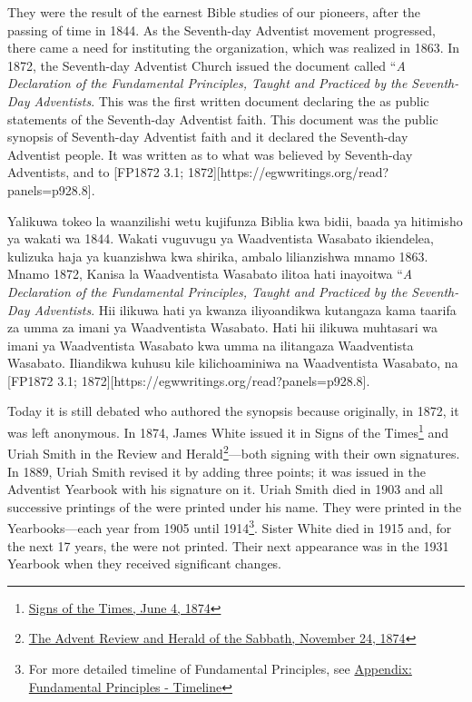They were the result of the earnest Bible studies of our pioneers, after the passing of time in 1844. As the Seventh-day Adventist movement progressed, there came a need for instituting the organization, which was realized in 1863. In 1872, the Seventh-day Adventist Church issued the document called “\textit{A Declaration of the Fundamental Principles, Taught and Practiced by the Seventh-Day Adventists}. This was the first written document declaring the  as public statements of the Seventh-day Adventist faith. This document was the public synopsis of Seventh-day Adventist faith and it declared  the Seventh-day Adventist people. It was written  as to what was believed by Seventh-day Adventists,  and to [FP1872 3.1; 1872][https://egwwritings.org/read?panels=p928.8].


Yalikuwa tokeo la waanzilishi wetu kujifunza Biblia kwa bidii, baada ya hitimisho ya wakati wa 1844. Wakati vuguvugu ya Waadventista Wasabato ikiendelea, kulizuka haja ya kuanzishwa kwa shirika, ambalo lilianzishwa mnamo 1863. Mnamo 1872, Kanisa la Waadventista Wasabato ilitoa hati inayoitwa “\textit{A Declaration of the Fundamental Principles, Taught and Practiced by the Seventh-Day Adventists}. Hii ilikuwa hati ya kwanza iliyoandikwa kutangaza  kama taarifa za umma za imani ya Waadventista Wasabato. Hati hii ilikuwa muhtasari wa imani ya Waadventista Wasabato kwa umma na ilitangaza  Waadventista Wasabato. Iliandikwa  kuhusu kile kilichoaminiwa na Waadventista Wasabato,  na [FP1872 3.1; 1872][https://egwwritings.org/read?panels=p928.8].


Today it is still debated who authored the synopsis because originally, in 1872, it was left anonymous. In 1874, James White issued it in Signs of the Times\footnote{\href{https://adventistdigitallibrary.org/adl-364148/signs-times-june-4-1874}{Signs of the Times, June 4, 1874}} and Uriah Smith in the Review and Herald\footnote{\href{http://documents.adventistarchives.org/Periodicals/RH/RH18741124-V44-22.pdf}{The Advent Review and Herald of the Sabbath, November 24, 1874}}—both signing with their own signatures. In 1889, Uriah Smith revised it by adding three points; it was issued in the Adventist Yearbook with his signature on it. Uriah Smith died in 1903 and all successive printings of the  were printed under his name. They were printed in the Yearbooks—each year from 1905 until 1914\footnote{For more detailed timeline of Fundamental Principles, see \hyperref[appendix:timeline]{Appendix: Fundamental Principles - Timeline}}. Sister White died in 1915 and, for the next 17 years, the  were not printed. Their next appearance was in the 1931 Yearbook when they received significant changes.


